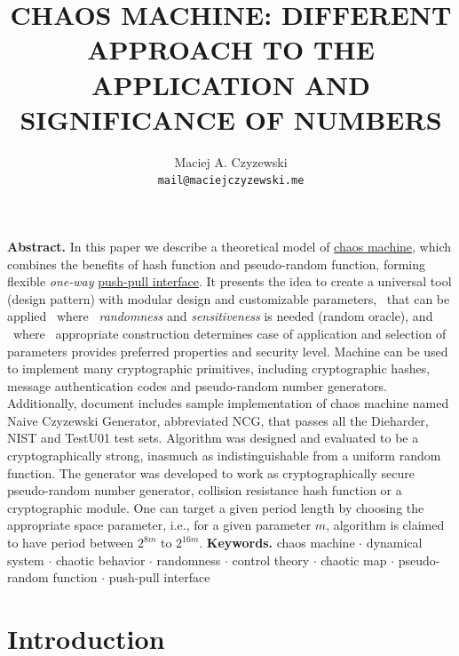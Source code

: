 \documentclass[twocolumn, a4paper, 10pt]{article}
\title{\fontsize{18.5}{14.4}\textbf{\MakeUppercase{Chaos Machine: Different Approach to the Application and Significance of Numbers}}}
\author{
  Maciej A. Czyzewski\\
  \texttt{mail@maciejczyzewski.me}
}
\begin{document}
\maketitle


\noindent\textbf{Abstract.} In this paper we describe a theoretical model of \underline{chaos machine}, which combines the benefits of hash function and pseudo-random function, forming flexible \textit{one-way} \underline{push-pull interface}. It presents the idea to create a universal tool (design pattern) with modular design and customizable parameters,   that can be applied    where   \textit{randomness} and \textit{sensitiveness} is needed (random oracle), and    where   appropriate construction determines case of application and selection of parameters provides preferred properties and security level. Machine can be used to implement many cryptographic primitives, including cryptographic hashes, message authentication codes and pseudo-random number generators.
Additionally, document includes sample implementation of chaos machine named Naive Czyzewski Generator, abbreviated NCG, that passes all the Dieharder, NIST and TestU01 test sets. Algorithm was designed and evaluated to be a cryptographically strong, inasmuch as indistinguishable from a uniform random function. The generator was developed to work as cryptographically secure pseudo-random number generator, collision resistance hash function or a cryptographic module. One can target a given period length by choosing the appropriate space parameter, i.e., for a given parameter $m$, algorithm is claimed to have period between $2^{8m}$ to $2^{16m}$.
\newline\newline
\noindent\textbf{Keywords.} chaos machine $\cdot$ dynamical system $\cdot$ chaotic behavior $\cdot$ randomness $\cdot$ control theory $\cdot$ chaotic map $\cdot$ pseudo-random function $\cdot$ push-pull interface


\section*{Introduction}
\end{document}
